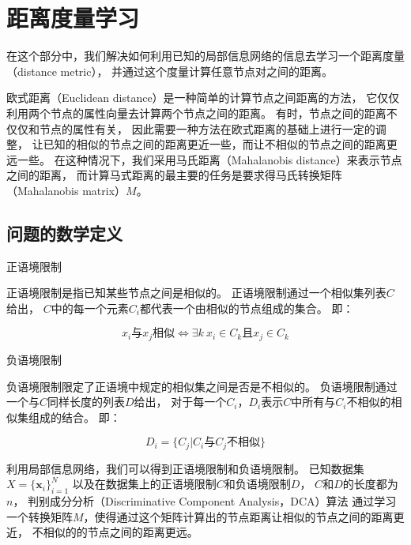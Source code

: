 
\chapter{距离度量学习}
\label{chap:dca}

在这个部分中，我们解决如何利用已知的局部信息网络的信息去学习一个距离度量（distance metric），
并通过这个度量计算任意节点对之间的距离。

欧式距离（Euclidean distance）是一种简单的计算节点之间距离的方法，
它仅仅利用两个节点的属性向量去计算两个节点之间的距离。
有时，节点之间的距离不仅仅和节点的属性有关，
因此需要一种方法在欧式距离的基础上进行一定的调整，
让已知的相似的节点之间的距离更近一些，而让不相似的节点之间的距离更远一些。
在这种情况下，我们采用马氏距离（Mahalanobis distance）来表示节点之间的距离，
而计算马式距离的最主要的任务是要求得马氏转换矩阵（Mahalanobis matrix）$M$。

\section{问题的数学定义}
\label{sec:dcadef}

\begin{defn}{正语境限制}
\label{defn:posconstraints}

    正语境限制是指已知某些节点之间是相似的。
    正语境限制通过一个相似集列表$C$给出，
    $C$中的每一个元素$C_i$都代表一个由相似的节点组成的集合。
    即：

    $$
    x_i\text{与}x_j\text{相似} \Longleftrightarrow \exists k \ x_i \in C_k \text{且} x_j \in C_k 
    $$

\end{defn}

\begin{defn}{负语境限制}
\label{defn:negconstraints}

    负语境限制限定了正语境中规定的相似集之间是否是不相似的。
    负语境限制通过一个与$C$同样长度的列表$D$给出，
    对于每一个$C_i$，$D_i$表示$C$中所有与$C_i$不相似的相似集组成的结合。
    即：

    $$
    D_i = \{C_j | C_i \text{与} C_j \text{不相似} \}
    $$

\end{defn}

利用局部信息网络，我们可以得到正语境限制和负语境限制。
已知数据集
$X = \{ \bm{x}_i \}_{i=1}^{N}$
以及在数据集上的正语境限制$C$和负语境限制$D$，
$C$和$D$的长度都为$n$，
判别成分分析（Discriminative Component Analysis，DCA）算法
通过学习一个转换矩阵$M$，使得通过这个矩阵计算出的节点距离让相似的节点之间的距离更近，
不相似的的节点之间的距离更远。

